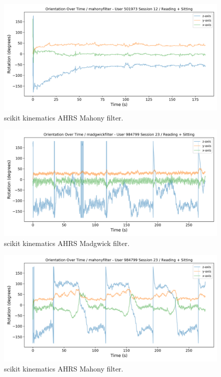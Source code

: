 \documentclass{article}
\begin{document}
\begin{figure}[ht]
  \includegraphics[width=1\linewidth]{images/501973_12_mahonyfilter.png}
  \caption[]{scikit kinematics AHRS Mahony filter.}
  \label{fig:501973_12_mahony}
\end{figure}

\begin{figure}[ht] %
  \includegraphics[width=1\linewidth]{images/984799_23_madgwickfilter.png}
  \caption[]{scikit kinematics AHRS Madgwick filter.}
  \label{fig:984799_23_madgwick}
\end{figure}

\begin{figure}[ht]
  \includegraphics[width=1\linewidth]{images/984799_23_mahonyfilter.png}
  \caption[]{scikit kinematics AHRS Mahony filter.}
  \label{fig:984799_23_mahony}
\end{figure}
\end{document}
